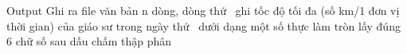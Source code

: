 Output
Ghi ra file văn bản n dòng, dòng thứ     ghi tốc độ tối đa (số km/1 đơn vị thời gian) của giáo sư trong ngày thứ     dưới dạng một số thực làm tròn lấy đúng 6 chữ số sau dấu chấm thập phân